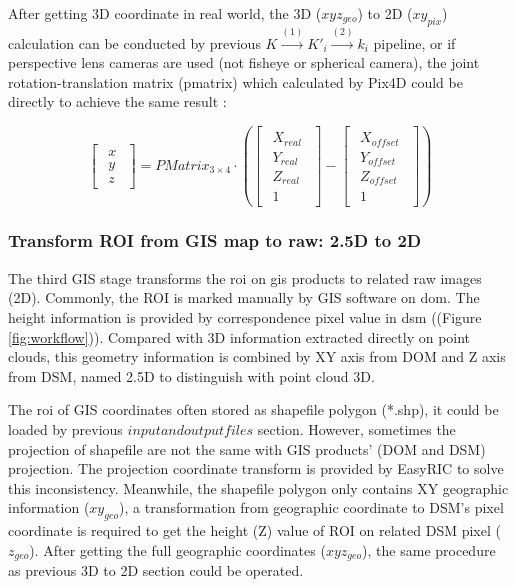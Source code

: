 \documentclass[doublespacing]{configs/bmcart}
\begin{document}
After getting 3D coordinate in real world, the 3D ($xyz_{geo}$) to 2D ($xy_{pix}$) calculation can be conducted by previous $K \xrightarrow{(1)} K'_i \xrightarrow{(2)} k_i$ pipeline, or if perspective lens cameras are used (not fisheye or spherical camera), the joint rotation-translation matrix (pmatrix) which calculated by Pix4D could be directly to achieve the same result \cite{pix4d_support_what_2020}:

$$
\begin{bmatrix}\begin{matrix} x \\ y \\ z\end{matrix}\end{bmatrix}
= PMatrix_{3\times4} \cdot 
\left(\begin{bmatrix}\begin{matrix} 
  X_{real} \\ Y_{real} \\ Z_{real} \\ 1
\end{matrix}\end{bmatrix} 
- 
\begin{bmatrix}\begin{matrix} 
  X_{offset} \\ Y_{offset} \\ Z_{offset} \\ 1
\end{matrix}\end{bmatrix}
\right)
$$

\subsubsection*{Transform ROI from GIS map to raw: 2.5D to 2D}
The third GIS stage transforms the \acrshort*{roi} on \acrshort*{gis} products to related raw images (2D). Commonly, the ROI is marked manually by GIS software on \acrshort*{dom}. The height information is provided by correspondence pixel value in \acrshort*{dsm} ((Figure \ref{fig:workflow})). Compared with 3D information extracted directly on point clouds, this geometry information is combined by XY axis from DOM and Z axis from DSM, named 2.5D to distinguish with point cloud 3D. 

The \acrshort*{roi} of GIS coordinates often stored as shapefile polygon (*.shp), it could be loaded by previous $input and output files$ section. However, sometimes the projection of shapefile are not the same with GIS products' (DOM and DSM) projection. The projection coordinate transform is provided by EasyRIC to solve this inconsistency. Meanwhile, the shapefile polygon only contains XY geographic information ($xy_{geo}$), a transformation from geographic coordinate to DSM's pixel coordinate is required to get the height (Z) value of ROI on related DSM pixel ($z_{geo}$). After getting the full geographic coordinates ($xyz_{geo}$), the same procedure as previous 3D to 2D section could be operated.
\end{document}
